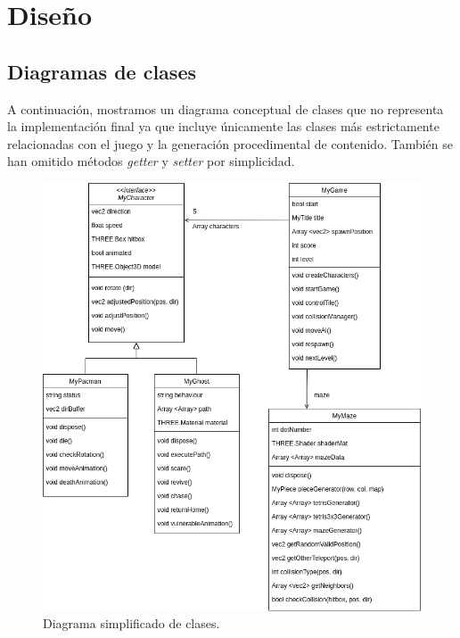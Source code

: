 \section{Diseño}

\subsection{Diagramas de clases}

A continuación, mostramos un diagrama conceptual de clases que no representa la implementación final ya que incluye únicamente las clases más estrictamente relacionadas con el juego y la generación procedimental de contenido. También se han omitido métodos \textit{getter} y \textit{setter} por simplicidad.\\

\begin{figure}[H]
    \begin{center}
        \includegraphics[scale=0.525]{img/clases.png}
        \caption{Diagrama simplificado de clases.}
    \end{center}
\end{figure}

\newpage
